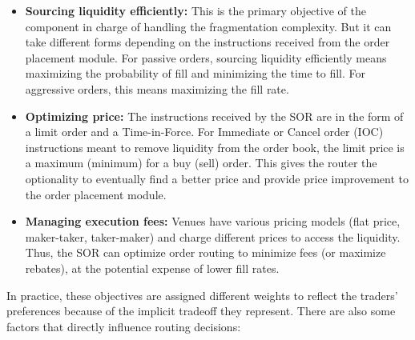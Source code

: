 \begin{itemize}
\item \textbf{Sourcing liquidity efficiently:} This is the primary objective of the component in charge of handling the fragmentation complexity. But it can take different forms depending on the instructions received from the order placement module. For passive orders, sourcing liquidity efficiently means maximizing the probability of fill and minimizing the time to fill. For aggressive orders, this means maximizing the fill rate.

\item \textbf{Optimizing price:} The instructions received by the SOR are in the form of a limit order and a Time-in-Force. For Immediate or Cancel order (IOC) instructions meant to remove liquidity from the order book, the limit price is a maximum (minimum) for a buy (sell) order. This gives the router the optionality to eventually find a better price and provide price improvement to the order placement module.

\item \textbf{Managing execution fees:} Venues have various pricing models (flat price, maker-taker, taker-maker) and charge different prices to access the liquidity. Thus, the SOR can optimize order routing to minimize fees (or maximize rebates), at the potential expense of lower fill rates.
\end{itemize}


In practice, these objectives are assigned different weights to reflect the traders' preferences because of the implicit tradeoff they represent. There are also some factors that directly influence routing decisions:


